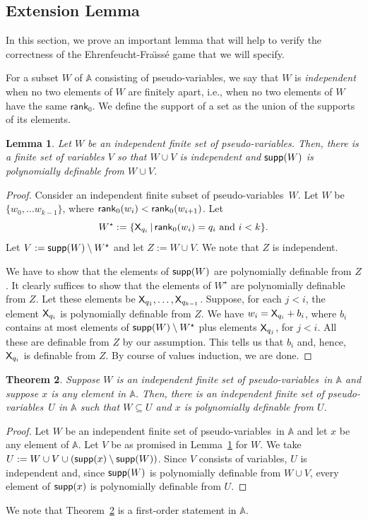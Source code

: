 \documentclass{amsart}
\newtheorem{theorem}{Theorem}[section]
\newtheorem{lem}[theorem]{Lemma}
\newcommand{\verz}[1]{\{ #1 \}}
\newcommand{\X}{{\sf X}}
\newcommand{\psvar}{pseudo-variables}
\begin{document}
\subsection{Extension Lemma}\label{sect_ext}
In this section, we prove an important lemma that will help to verify the
correctness of the  Ehrenfeucht-Fra\"{\i}ss\'{e} game that we will specify.

For a subset $W$ of $\mathbb{A}$ consisting of pseudo-variables, we say that $W$ is \emph{independent} when no two elements of $W$ are finitely apart, i.e., when no two elements of $W$ have the same $\mathsf{rank}_0$. We define the support of a set as the union of the supports of its elements.

\begin{lem}\label{spelendesmurf} Let $W$ be an independent finite set of \psvar. Then, there is a finite set of variables $V$ so that
 $W\cup V$ is independent and ${\sf supp}(W)$ is polynomially definable from $W\cup V$.
 \end{lem}

\begin{proof}
Consider an independent finite subset of \psvar\ $W$. Let
$W$ be $\verz{w_0, \dots w_{k-1}}$, where ${\sf rank}_0(w_i) < {\sf rank}_0(w_{i+1})$.
Let \[W^\star:= \verz{\X_{q_i}\mathop\mid {\sf rank}_0(w_i)=q_i\text{ and } i<k}.\]
Let 
$V :=  {\sf supp}(W) \setminus W^\star$ and let $Z := W\cup V$. We note that $Z$ is independent.

We have to show that the elements of ${\sf supp}(W)$ are polynomially definable from $Z$.
It clearly suffices to show that the elements of $W^\star$ are polynomially definable from $Z$.
Let these elements be $\X_{q_1},\dots,\X_{q_{k-1}}$.
Suppose, for each $j<i$, the element $\X_{q_i}$ is polynomially definable from $Z$.
We have $w_i = \X_{q_i}+b_i$, where $b_i$ contains at most elements of ${\sf supp}(W) \setminus W^\star$ plus
elements $\X_{q_j}$, for $j<i$. All these are definable from $Z$ by our assumption.
This tells us that $b_i$ and, hence, $\X_{q_i}$ is definable from $Z$.
By course of values induction, we are done.
\end{proof}

\begin{theorem}\label{smurfoludens}
Suppose $W$ is an independent finite set of \psvar\ in $\mathbb{A}$
and suppose $x$ is any element in $\mathbb{A}$. 
Then, there is an independent finite set of \psvar\ $U$  in $\mathbb{A}$ such that
$W\subseteq U$ and $x$ is polynomially definable from $U$.
\end{theorem}
%
\begin{proof}
Let $W$ be an independent finite set of \psvar\ in $\mathbb{A}$ and let $x$ be any element of $\mathbb{A}$. 
Let $V$ be as promised in Lemma~\ref{spelendesmurf} for $W$. 
We take $U := W \cup V \cup ({\sf supp}(x) \setminus {\sf supp}(W))$.  Since $V$ consists of variables, 
$U$ is independent and, since ${\sf supp}(W)$ is polynomially definable from $W\cup V$,
 every element of ${\sf supp}(x)$ is polynomially definable from $U$.
\end{proof}
%
\noindent
We note that Theorem~\ref{smurfoludens} is a first-order statement in $\mathbb A$.
\end{document}
